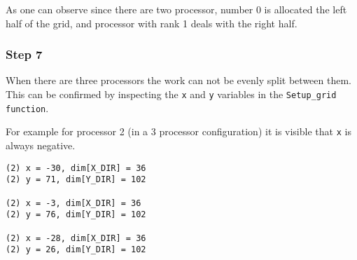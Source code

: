 As one can observe since there are two processor, number 0 is allocated the left half of the grid, and processor with rank 1 deals with the right half.

\subsubsection{Step 7}




When there are three processors the work can not be evenly split between them. This can be confirmed by inspecting the \texttt{x} and \texttt{y} variables in the \texttt{Setup\_grid function}.

For example for processor 2 (in a 3 processor configuration) it is visible that \texttt{x} is always negative.

\begin{lstlisting}
(2) x = -30, dim[X_DIR] = 36
(2) y = 71, dim[Y_DIR] = 102

(2) x = -3, dim[X_DIR] = 36
(2) y = 76, dim[Y_DIR] = 102

(2) x = -28, dim[X_DIR] = 36
(2) y = 26, dim[Y_DIR] = 102
\end{lstlisting}


